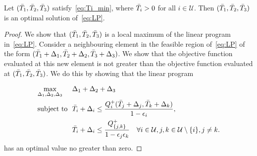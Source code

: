 \begin{myLemma}
\label{lem:MinToLP}
	Let $(\bar{T}_{1}, \bar{T}_{2}, \bar{T}_{3})$ satisfy~\eqref{eq:Ti_min}, where $\bar{T}_{i} > 0$ for all $i \in \mathcal{U}$.  Then $(\bar{T}_{1}, \bar{T}_{2}, \bar{T}_{3})$ is an optimal solution of~\eqref{eq:LP}.
\end{myLemma}
\begin{proof}
	We show that $(\bar{T}_{1}, \bar{T}_{2}, \bar{T}_{3})$ is a local maximum of the linear program in~\eqref{eq:LP}.  Consider a neighbouring  element in the feasible region of~\eqref{eq:LP} of the form $(\bar{T}_{1} + \Delta_1, \bar{T}_{2} + \Delta_2, \bar{T}_{3} + \Delta_3)$.  We show that the objective function evaluated at this new element is not greater than the objective function evaluated at $(\bar{T}_{1}, \bar{T}_{2}, \bar{T}_{3})$.  We do this by showing that the linear program

	
\begin{equation}
\label{eq:local}
\begin{aligned}
	& \underset{\Delta_{1}, \Delta_{2}, \Delta_{3}}{\text{max}}
	&& \!\! \Delta_{1} + \Delta_{2} + \Delta_{3}\\
	& \text{subject to}
	&& 	\!\! \bar{T}_{i} + \Delta_i \leq \frac{Q_{i}^{+}(\bar{T}_{j} + \Delta_j,\bar{T}_{k} + \Delta_k) }{1 - \epsilon_i},\\
	&&& \!\!\bar{T}_i + \Delta_i \leq \frac{Q_{\{j,k\}}^{+}}{1 - \epsilon_j\epsilon_k} \quad \forall i \in \mathcal{U}, j,k \in \mathcal{U}\setminus \{i\} , j \neq k.
\end{aligned}
\end{equation}
%	
has an optimal value no greater than zero.  


\end{proof}
